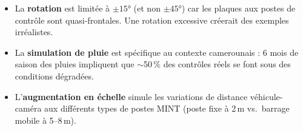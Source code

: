 \documentclass[12pt,a4paper]{article}
\begin{document}
\begin{itemize}
  \item La \textbf{rotation} est limit\'{e}e \`{a} $\pm 15°$ (et non $\pm 45°$)
        car les plaques aux postes de contr\^{o}le sont quasi-frontales.
        Une rotation excessive cr\'{e}erait des exemples irr\'{e}alistes.
  \item La \textbf{simulation de pluie} est sp\'{e}cifique au contexte
        camerounais : 6 mois de saison des pluies impliquent que $\sim$50\,\%
        des contr\^{o}les r\'{e}els se font sous des conditions d\'{e}grad\'{e}es.
  \item L'\textbf{augmentation en \'{e}chelle} simule les variations de
        distance v\'{e}hicule-cam\'{e}ra aux diff\'{e}rents types de postes MINT
        (poste fixe \`{a} 2\,m vs.\ barrage mobile \`{a} 5--8\,m).
\end{itemize}
\end{document}
